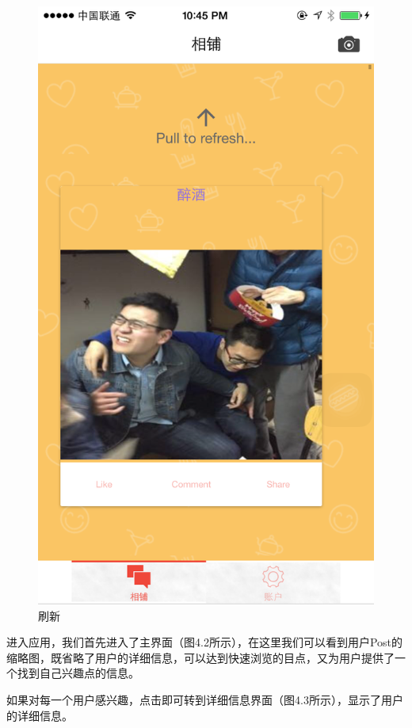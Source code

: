 \begin{figure}[h]
\begin{minipage}[t]{0.3\linewidth}
\includegraphics[width=\textwidth]{img/chap4/info3.PNG}
\caption{刷新\label{snapchat}}
\end{minipage}
\hfill
\end{figure}

进入应用，我们首先进入了主界面（图4.2所示），在这里我们可以看到用户Post的缩略图，既省略了用户的详细信息，可以达到快速浏览的目点，又为用户提供了一个找到自己兴趣点的信息。

如果对每一个用户感兴趣，点击即可转到详细信息界面（图4.3所示），显示了用户的详细信息。

